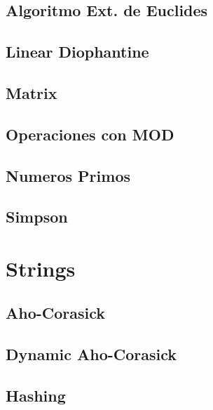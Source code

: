 \subsection{Algoritmo Ext. de Euclides}
\raggedbottom
\hrulefill
\subsection{Linear Diophantine}
\raggedbottom
\hrulefill
\subsection{Matrix}
\raggedbottom
\hrulefill
\subsection{Operaciones con MOD}
\raggedbottom
\hrulefill
\subsection{Numeros Primos}
\raggedbottom
\hrulefill
\subsection{Simpson}
\raggedbottom
\hrulefill
\newpage

\section{Strings}
\subsection{Aho-Corasick}
\raggedbottom
\hrulefill
\subsection{Dynamic Aho-Corasick}
\raggedbottom
\hrulefill
\subsection{Hashing}
\raggedbottom
\hrulefill
